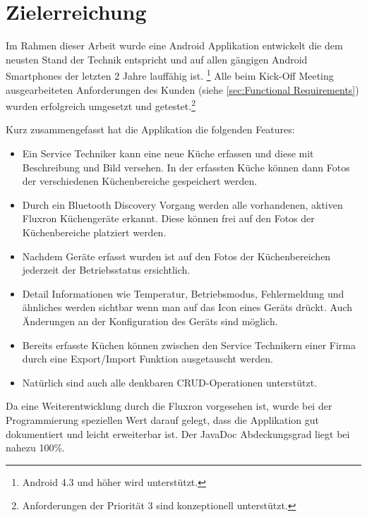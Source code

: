 \section{Zielerreichung}

Im Rahmen dieser Arbeit wurde eine Android Applikation entwickelt die dem neusten Stand der Technik entspricht und auf allen gängigen Android Smartphones der letzten 2 Jahre lauffähig ist. \footnote{Android 4.3 und höher wird unterstützt.} Alle beim Kick-Off Meeting ausgearbeiteten Anforderungen des Kunden (siehe \ref{sec:Functional Requirements}) wurden erfolgreich umgesetzt und getestet.\footnote{Anforderungen der Priorität 3 sind konzeptionell unterstützt.}

Kurz zusammengefasst hat die Applikation die folgenden Features:

\begin{itemize}
\item Ein Service Techniker kann eine neue Küche erfassen und diese mit Beschreibung und Bild versehen. In der erfassten Küche können dann Fotos der verschiedenen Küchenbereiche gespeichert werden. 
\item Durch ein Bluetooth Discovery Vorgang werden alle vorhandenen, aktiven Fluxron Küchengeräte erkannt. Diese können frei auf den Fotos der Küchenbereiche platziert werden.
\item Nachdem Geräte erfasst wurden ist auf den Fotos der Küchenbereichen jederzeit der Betriebsstatus ersichtlich. 
\item Detail Informationen wie Temperatur, Betriebsmodus, Fehlermeldung und ähnliches werden sichtbar wenn man auf das Icon eines Geräts drückt. Auch Änderungen an der Konfiguration des Geräts sind möglich.
\item Bereits erfasste Küchen können zwischen den Service Technikern einer Firma durch eine Export/Import Funktion ausgetauscht werden.
\item Natürlich sind auch alle denkbaren \ac{CRUD}-Operationen unterstützt.
\end{itemize}

Da eine Weiterentwicklung durch die Fluxron vorgesehen ist, wurde bei der Programmierung speziellen Wert darauf gelegt, dass die Applikation gut dokumentiert und leicht erweiterbar ist. Der JavaDoc Abdeckungsgrad liegt bei nahezu 100\%.